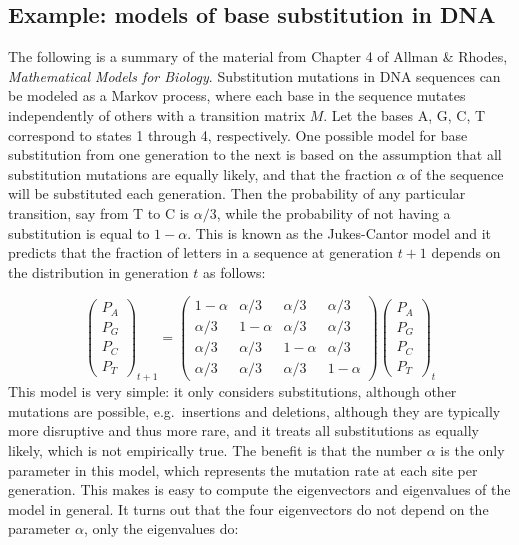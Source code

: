 \documentclass[
  letterpaper,
  DIV=11,
  numbers=noendperiod]{scrreprt}
\begin{document}
\subsection{Example: models of base substitution in
DNA}\label{example-models-of-base-substitution-in-dna}

The following is a summary of the material from Chapter 4 of Allman \&
Rhodes, \emph{Mathematical Models for Biology}. Substitution mutations
in DNA sequences can be modeled as a Markov process, where each base in
the sequence mutates independently of others with a transition matrix
\(M\). Let the bases A, G, C, T correspond to states 1 through 4,
respectively. One possible model for base substitution from one
generation to the next is based on the assumption that all substitution
mutations are equally likely, and that the fraction \(\alpha\) of the
sequence will be substituted each generation. Then the probability of
any particular transition, say from T to C is \(\alpha/3\), while the
probability of not having a substitution is equal to \(1-\alpha\). This
is known as the Jukes-Cantor model and it predicts that the fraction of
letters in a sequence at generation \(t+1\) depends on the distribution
in generation \(t\) as follows:

\[   
\left(\begin{array}{c} P_A \\ P_G \\ P_C \\ P_T \end{array}\right)_{t+1}  = \left(\begin{array}{cccc}1-\alpha & \alpha/3 & \alpha/3 & \alpha/3 \\\alpha/3 & 1-\alpha & \alpha/3 & \alpha/3 \\\alpha/3 & \alpha/3 & 1-\alpha & \alpha/3 \\\alpha/3 & \alpha/3 & \alpha/3 & 1-\alpha\end{array}\right) \left(\begin{array}{c} P_A \\ P_G \\ P_C \\ P_T \end{array}\right)_t 
\] This model is very simple: it only considers substitutions, although
other mutations are possible, e.g.~insertions and deletions, although
they are typically more disruptive and thus more rare, and it treats all
substitutions as equally likely, which is not empirically true. The
benefit is that the number \(\alpha\) is the only parameter in this
model, which represents the mutation rate at each site per generation.
This makes is easy to compute the eigenvectors and eigenvalues of the
model in general. It turns out that the four eigenvectors do not depend
on the parameter \(\alpha\), only the eigenvalues do:
\end{document}

